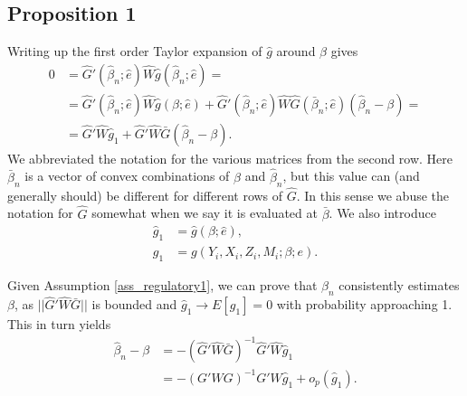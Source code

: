 \documentclass{article}
\theoremstyle{definition}
\theoremstyle{remark}
\begin{document}
\subsection{Proposition 1}
Writing up the first order Taylor expansion of $\hat{g}$ around $\beta$ gives
\begin{align}
0&=\hat{G}'(\hat{\beta}_n;\hat{e})\hat{W}\hat{g}(\hat{\beta}_n;\hat{e})= \\ &=\hat{G}'(\hat{\beta}_n;\hat{e})\hat{W}\hat{g}(\beta;\hat{e})+ \hat{G}'(\hat{\beta}_n;\hat{e})\hat{W}\hat{G}(\bar{\beta}_n;\hat{e})(\hat{\beta}_n-\beta)= \nonumber \\
&= \hat{G}'\hat{W}\hat{g}_1+ \hat{G}'\hat{W}\bar{G}(\hat{\beta}_n-\beta). \nonumber
\end{align}
We abbreviated the notation for the various matrices from the second row. Here $\bar{\beta}_n$ is a vector of convex combinations of $\beta$ and $\hat{\beta}_n$, but this value can (and generally should) be different for different rows of $\hat{G}$. In this sense we abuse the notation for $\hat{G}$ somewhat when we say it is evaluated at $\bar{\beta}$. We also introduce
\begin{align}
\hat{g}_1&=\hat{g}(\beta;\hat{e}), \\
g_1 &= g(Y_i, X_i, Z_i, M_i; \beta; e).
\end{align}

Given Assumption \ref{ass_regulatory1}, we can prove that $\hat{\beta}_n$ consistently estimates $\beta$, as $||\hat{G}'\hat{W}\bar{G}||$ is bounded and $\hat{g}_1 \rightarrow E[g_1]=0$ with probability approaching 1. This in turn yields
\begin{align}
\hat{\beta}_n -\beta&=-(\hat{G}'\hat{W}\bar{G})^{-1} \hat{G}'\hat{W} \hat{g}_1 \\
&= -(G'WG)^{-1}G'W \hat{g}_1 + o_p(\hat{g}_1).\nonumber
\end{align}
\end{document}
